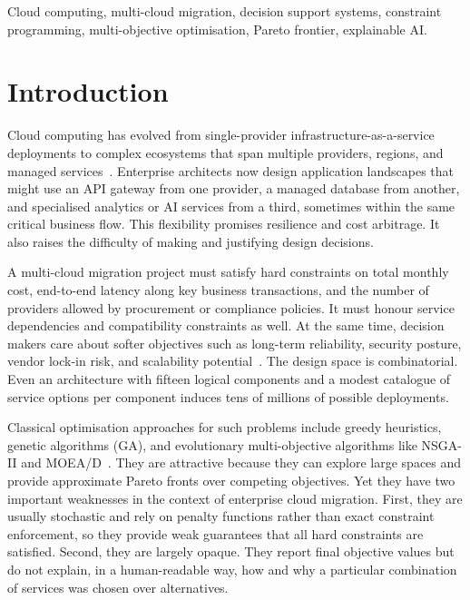 \documentclass[journal]{IEEEtran}
\begin{document}
\begin{IEEEkeywords}
Cloud computing, multi-cloud migration, decision support systems, constraint
programming, multi-objective optimisation, Pareto frontier, explainable AI.
\end{IEEEkeywords}

\section{Introduction}
\label{sec:intro}

Cloud computing has evolved from single-provider infrastructure-as-a-service
deployments to complex ecosystems that span multiple providers, regions, and
managed services~\cite{armbrust_view,buyya_cloud,zhang_cloudstate}. Enterprise
architects now design application landscapes that might use an API gateway from
one provider, a managed database from another, and specialised analytics or AI
services from a third, sometimes within the same critical business flow. This
flexibility promises resilience and cost arbitrage. It also raises the difficulty
of making and justifying design decisions.

A multi-cloud migration project must satisfy hard constraints on total monthly
cost, end-to-end latency along key business transactions, and the number of
providers allowed by procurement or compliance policies. It must honour service
dependencies and compatibility constraints as well. At the same time, decision
makers care about softer objectives such as long-term reliability, security
posture, vendor lock-in risk, and scalability potential~\cite{zhang_cloudstate,
garg_framework}. The design space is combinatorial. Even an architecture with
fifteen logical components and a modest catalogue of service options per
component induces tens of millions of possible deployments.

Classical optimisation approaches for such problems include greedy heuristics,
genetic algorithms (GA), and evolutionary multi-objective algorithms like
NSGA-II and MOEA/D~\cite{deb_nsga2,zhang_moead,zeng_marketoriented}. They
are attractive because they can explore large spaces and provide approximate
Pareto fronts over competing objectives. Yet they have two important weaknesses
in the context of enterprise cloud migration. First, they are usually stochastic
and rely on penalty functions rather than exact constraint enforcement, so they
provide weak guarantees that all hard constraints are satisfied. Second, they
are largely opaque. They report final objective values but do not explain, in a
human-readable way, how and why a particular combination of services was chosen
over alternatives.
\end{document}
